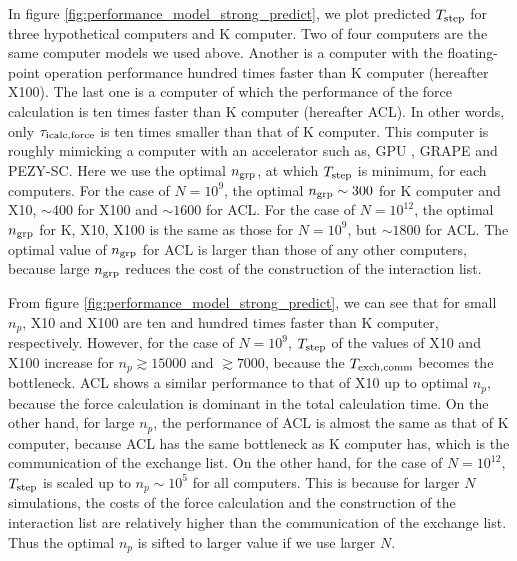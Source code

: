 In figure \ref{fig:performance_model_strong_predict}, we plot
predicted $T_{\rm step}$ for three hypothetical computers and K
computer. Two of four computers are the same computer models we used
above. Another is a computer with the floating-point operation
performance hundred times faster than K computer (hereafter X100).
The last one is a computer of which the performance of the force
calculation is ten times faster than K computer (hereafter ACL). In
other words, only $\tau_{\rm icalc,force}$ is ten times smaller than
that of K computer.  This computer is roughly mimicking a computer
with an accelerator such as, GPU \citep{hamada2009novel},
GRAPE \citep{1990Natur.345...33S, 2003PASJ...55.1163M} and
PEZY-SC. Here we use the optimal $n_{\rm grp}$, at which $T_{\rm
step}$ is minimum, for each computers. For the case of $N=10^9$, the
optimal $n_{\rm grp} \sim 300$ for K computer and X10, $\sim 400$ for
X100 and $\sim 1600$ for ACL. For the case of $N=10^{12}$, the optimal
$n_{\rm grp}$ for K, X10, X100 is the same as those for $N=10^9$, but
$\sim 1800$ for ACL. The optimal value of $n_{\rm grp}$ for ACL is
larger than those of any other computers, because large $n_{\rm grp}$
reduces the cost of the construction of the interaction list.

From figure \ref{fig:performance_model_strong_predict}, we can see
that for small $n_p$, X10 and X100 are ten and hundred times faster
than K computer, respectively. However, for the case of $N=10^9$,
$T_{\rm step}$ of the values of X10 and X100 increase for $n_p \gtrsim
15000$ and $\gtrsim 7000$, because the $T_{\rm exch,comm}$ becomes the
bottleneck. ACL shows a similar performance to that of X10 up to
optimal $n_p$, because the force calculation is dominant in the total
calculation time. On the other hand, for large $n_p$, the performance
of ACL is almost the same as that of K computer, because ACL has the
same bottleneck as K computer has, which is the communication of the
exchange list.  On the other hand, for the case of $N=10^{12}$,
$T_{\rm step}$ is scaled up to $n_p \sim 10^5$ for all computers. This
is because for larger $N$ simulations, the costs of the force
calculation and the construction of the interaction list are
relatively higher than the communication of the exchange list. Thus
the optimal $n_p$ is sifted to larger value if we use larger $N$.



